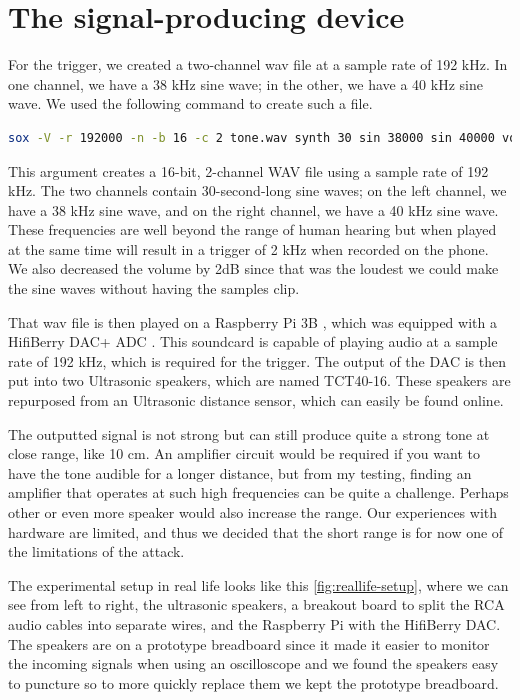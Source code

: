 \documentclass{report}
\theoremstyle{definition}
\theoremstyle{remark}
\begin{document}
\section{The signal-producing device \label{TRIGGER}}
For the trigger, we created a two-channel wav file at a sample rate of 192 kHz. In one channel, we have a 38 kHz sine wave; in the other, we have a 40 kHz sine wave. We used the following command to create such a file.
\begin{lstlisting}[language=bash]
sox -V -r 192000 -n -b 16 -c 2 tone.wav synth 30 sin 38000 sin 40000 vol -2dB
\end{lstlisting}
This argument creates a 16-bit, 2-channel WAV file using a sample rate of 192 kHz. The two channels contain 30-second-long sine waves; on the left channel, we have a 38 kHz sine wave, and on the right channel, we have a 40 kHz sine wave. These frequencies are well beyond the range of human hearing but when played at the same time will result in a trigger of 2 kHz when recorded on the phone. We also decreased the volume by 2dB since that was the loudest we could make the sine waves without having the samples clip.

That wav file is then played on a Raspberry Pi 3B \cite{RASPBERRY}, which was equipped with a HifiBerry DAC+ ADC \cite{HIFIBERRY}. This soundcard is capable of playing audio at a sample rate of 192 kHz, which is required for the trigger. The output of the DAC is then put into two Ultrasonic speakers, which are named TCT40-16. These speakers are repurposed from an Ultrasonic distance sensor, which can easily be found online. 

The outputted signal is not strong but can still produce quite a strong tone at close range, like 10 cm. An amplifier circuit would be required if you want to have the tone audible for a longer distance, but from  my testing, finding an amplifier that operates at such high frequencies can be quite a challenge. Perhaps other or even more speaker would also increase the range. Our experiences with hardware are limited, and thus we decided that the short range is for now one of the limitations of the attack.

The experimental setup in real life looks like this \autoref{fig:reallife-setup}, where we can see from left to right, the ultrasonic speakers, a breakout board to split the RCA audio cables into separate wires, and the Raspberry Pi with the HifiBerry DAC. The speakers are on a prototype breadboard since it made it easier to monitor the incoming signals when using an oscilloscope and we found the speakers easy to puncture so to more quickly replace them we kept the prototype breadboard.
\end{document}
